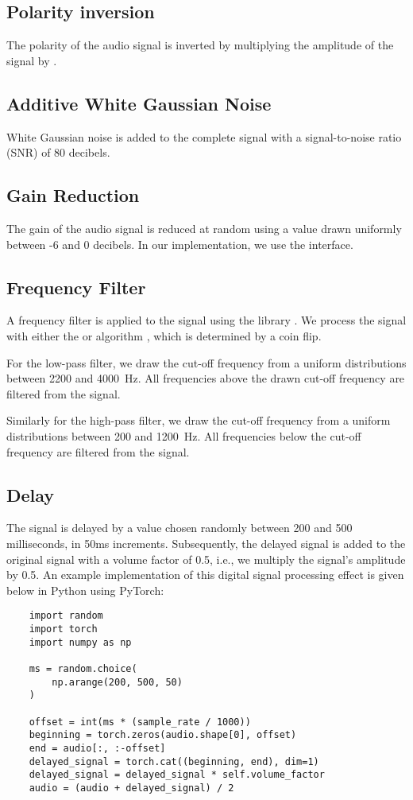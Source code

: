 \documentclass{article}
\begin{document}
\subsection{Polarity inversion}
The polarity of the audio signal is inverted by multiplying the amplitude of the signal by . 

\subsection{Additive White Gaussian Noise}
White Gaussian noise is added to the complete signal with a signal-to-noise ratio (SNR) of 80 decibels.

\subsection{Gain Reduction}
The gain of the audio signal is reduced at random using a value drawn uniformly between -6 and 0 decibels. In our implementation, we use the  interface.

\subsection{Frequency Filter}
A frequency filter is applied to the signal using the  library \cite{essentia}. We process the signal with either the  or  algorithm \cite{zolzer2002dafx}, which is determined by a coin flip.

For the low-pass filter, we draw the cut-off frequency from a uniform distributions between 2200 and 4000~Hz. All frequencies above the drawn cut-off frequency are filtered from the signal.

Similarly for the high-pass filter, we draw the cut-off frequency from a uniform distributions between 200 and 1200~Hz. All frequencies below the cut-off frequency are filtered from the signal.


\subsection{Delay}
The signal is delayed by a value chosen randomly between 200 and 500 milliseconds, in 50ms increments. Subsequently, the delayed signal is added to the original signal with a volume factor of 0.5, i.e., we multiply the signal's amplitude by 0.5. An example implementation of this digital signal processing effect is given below in Python using PyTorch:

\begin{verbatim}
    import random
    import torch
    import numpy as np

    ms = random.choice(
        np.arange(200, 500, 50)
    )

    offset = int(ms * (sample_rate / 1000))
    beginning = torch.zeros(audio.shape[0], offset)
    end = audio[:, :-offset]
    delayed_signal = torch.cat((beginning, end), dim=1)
    delayed_signal = delayed_signal * self.volume_factor
    audio = (audio + delayed_signal) / 2
\end{verbatim}
\end{document}

